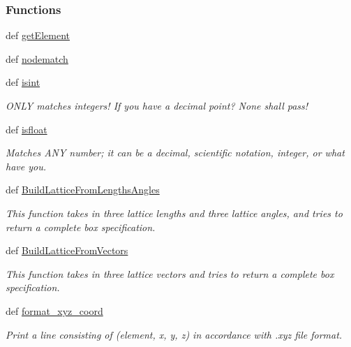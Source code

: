 \subsubsection*{Functions}
\begin{DoxyCompactItemize}
\item 
def \hyperlink{namespaceforcebalance_1_1molecule_af28de4693e5b8e82df900d0ac3c6c370}{get\-Element}
\item 
def \hyperlink{namespaceforcebalance_1_1molecule_ab8464fea13fad2a506792c2f1d7c93f3}{nodematch}
\item 
def \hyperlink{namespaceforcebalance_1_1molecule_a0dd31eff88d2bed0884ab21a13261d42}{isint}
\begin{DoxyCompactList}\small\item\em O\-N\-L\-Y matches integers! If you have a decimal point? None shall pass! \end{DoxyCompactList}\item 
def \hyperlink{namespaceforcebalance_1_1molecule_afe989ffd119568047fc8265b1d329a70}{isfloat}
\begin{DoxyCompactList}\small\item\em Matches A\-N\-Y number; it can be a decimal, scientific notation, integer, or what have you. \end{DoxyCompactList}\item 
def \hyperlink{namespaceforcebalance_1_1molecule_a0a6e3e79b04534bf2e83d09def189444}{Build\-Lattice\-From\-Lengths\-Angles}
\begin{DoxyCompactList}\small\item\em This function takes in three lattice lengths and three lattice angles, and tries to return a complete box specification. \end{DoxyCompactList}\item 
def \hyperlink{namespaceforcebalance_1_1molecule_a29fb1ac9324f4280f07c65baea339989}{Build\-Lattice\-From\-Vectors}
\begin{DoxyCompactList}\small\item\em This function takes in three lattice vectors and tries to return a complete box specification. \end{DoxyCompactList}\item 
def \hyperlink{namespaceforcebalance_1_1molecule_a2eba3cad44138b3b10ea883240888412}{format\-\_\-xyz\-\_\-coord}
\begin{DoxyCompactList}\small\item\em Print a line consisting of (element, x, y, z) in accordance with .xyz file format. \end{DoxyCompactList}\item 

\end{DoxyCompactItemize}
